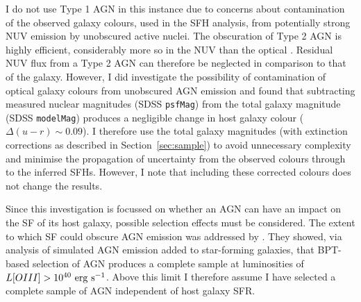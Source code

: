 I do not use Type 1 AGN in this instance due to concerns about contamination of the observed galaxy colours, used in the SFH analysis, from potentially strong NUV emission by unobscured active nuclei. The obscuration of Type 2 AGN is highly efficient, considerably more so in the NUV than the optical \citep{Simmons11}. Residual NUV flux from a Type 2 AGN can therefore be neglected in comparison to that of the galaxy. However, I did investigate the possibility of contamination of optical galaxy colours from unobscured AGN emission and found that subtracting measured nuclear magnitudes (SDSS {\tt psfMag}) from the total galaxy magnitude (SDSS {\tt modelMag}) produces a negligible change in host galaxy colour ($\Delta(u-r) \sim 0.09$). I therefore use the total galaxy magnitudes (with extinction corrections as described in Section~\ref{sec:sample}) to avoid unnecessary complexity and minimise the propagation of uncertainty from the observed colours through to the inferred SFHs. However, I note that including these corrected colours does not change the results.

Since this investigation is focussed on whether an AGN can have an impact on the SF of its host galaxy, possible selection effects must be considered. The extent to which SF could obscure AGN emission was addressed by \cite{schawinski10a}. They showed, via analysis of simulated AGN emission added to star-forming galaxies, that BPT-based selection of AGN produces a complete sample at luminosities of $L[OIII] > 10^{40}~\rm{erg~s}^{-1}$. Above this limit I therefore assume I have selected a complete sample of AGN independent of host galaxy SFR. 

